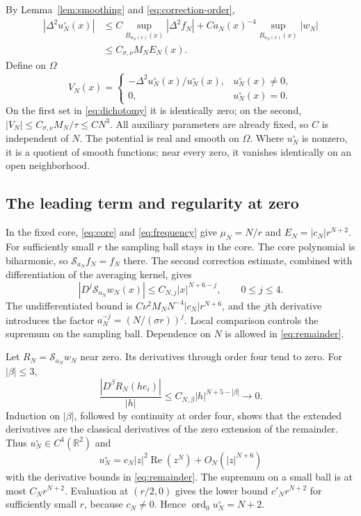 \documentclass[11pt,twoside,leqno]{article}
\numberwithin{equation}{section}
\theoremstyle{definition}
\theoremstyle{remark}
\newcommand{\R}{\mathbb R}
\newcommand{\ord}{\operatorname{ord}}
\newcommand{\Om}{\Omega}
\begin{document}
By Lemma~\ref{lem:smoothing} and \eqref{eq:correction-order},
\begin{align*}
 |\Delta^2u_N^\circ(x)|
 &\le C\sup_{B_{a_N(x)}(x)}|\Delta^2f_N|
       +Ca_N(x)^{-4}\sup_{B_{a_N(x)}(x)}|w_N|\\
 &\le C_{\sigma,\nu}M_NE_N(x).
\end{align*}
Define on $\Om$
\begin{equation}\label{eq:potential}
 V_N(x)=
 \begin{cases}
 -\Delta^2u_N^\circ(x)/u_N^\circ(x),&u_N^\circ(x)\ne0,\\
 0,&u_N^\circ(x)=0.
 \end{cases}
\end{equation}
On the first set in \eqref{eq:dichotomy} it is identically zero;
on the second, $|V_N|\le C_{\sigma,\nu}M_N/\tau\le CN^3$.
All auxiliary parameters are already fixed, so $C$ is independent of
$N$. The potential is real and smooth on $\Om$. Where $u_N^\circ$ is
nonzero, it is a quotient of smooth functions; near every zero, it
vanishes identically on an open neighborhood.

\subsection{The leading term and regularity at zero}

In the fixed core, \eqref{eq:core} and \eqref{eq:frequency} give
$\mu_N=N/r$ and $E_N=|c_N|r^{N+2}$. For sufficiently small $r$ the
sampling ball stays in the core. The core polynomial is biharmonic, so
$\mathcal S_{a_N}f_N=f_N$ there. The second correction estimate,
combined with differentiation of the averaging kernel, gives
\begin{equation}\label{eq:remainder}
 |D^j\mathcal S_{a_N}w_N(x)|\le C_{N,j}|x|^{N+6-j},
 \qquad0\le j\le4.
\end{equation}
The undifferentiated bound is
$C\nu^2M_NN^{-4}|c_N|r^{N+6}$, and the $j$th derivative introduces
the factor $a_N^{-j}=(N/(\sigma r))^j$. Local comparison controls
the supremum on the sampling ball. Dependence on $N$ is allowed in
\eqref{eq:remainder}.

Let $R_N=\mathcal S_{a_N}w_N$ near zero. Its derivatives through order
four tend to zero. For $|\beta|\le3$,
\[
 \frac{|D^\beta R_N(he_i)|}{|h|}
 \le C_{N,\beta}|h|^{N+5-|\beta|}\longrightarrow0.
\]
Induction on $|\beta|$, followed by continuity at order four, shows
that the extended derivatives are the classical derivatives of the
zero extension of the remainder.
Thus $u_N^\circ\in C^4(\R^2)$ and
\[
 u_N^\circ=c_N|z|^2\operatorname{Re}(z^N)+O_N(|z|^{N+6})
\]
with the derivative bounds in \eqref{eq:remainder}.
The supremum on a small ball is at most $C_Nr^{N+2}$. Evaluation at
$(r/2,0)$ gives the lower bound $c'_Nr^{N+2}$ for sufficiently small
$r$, because $c_N\ne0$. Hence $\ord_0u_N^\circ=N+2$.
\end{document}
